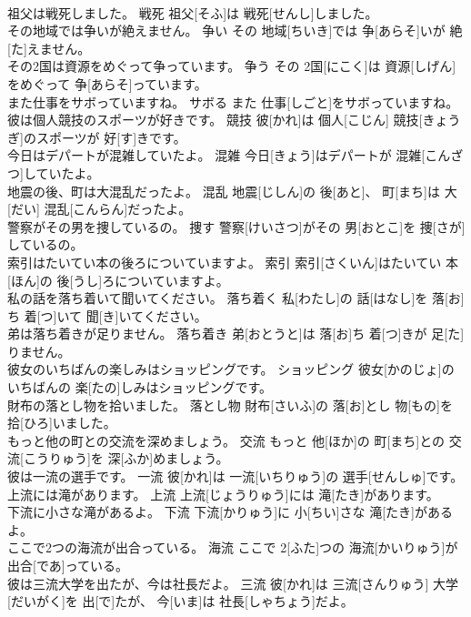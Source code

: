 \documentclass[8pt]{extreport}
\begin{document}
\begin{CJK}{UTF8}{min}
\\	祖父は戦死しました。	戦死	祖父[そふ]は 戦死[せんし]しました。	
\\	その地域では争いが絶えません。	争い	その 地域[ちいき]では 争[あらそ]いが 絶[た]えません。	
\\	その2国は資源をめぐって争っています。	争う	その 2国[にこく]は 資源[しげん]をめぐって 争[あらそ]っています。	
\\	また仕事をサボっていますね。	サボる	また 仕事[しごと]をサボっていますね。	
\\	彼は個人競技のスポーツが好きです。	競技	彼[かれ]は 個人[こじん] 競技[きょうぎ]のスポーツが 好[す]きです。	
\\	今日はデパートが混雑していたよ。	混雑	今日[きょう]はデパートが 混雑[こんざつ]していたよ。	
\\	地震の後、町は大混乱だったよ。	混乱	地震[じしん]の 後[あと]、 町[まち]は 大[だい] 混乱[こんらん]だったよ。	
\\	警察がその男を捜しているの。	捜す	警察[けいさつ]がその 男[おとこ]を 捜[さが]しているの。	
\\	索引はたいてい本の後ろについていますよ。	索引	索引[さくいん]はたいてい 本[ほん]の 後[うし]ろについていますよ。	
\\	私の話を落ち着いて聞いてください。	落ち着く	私[わたし]の 話[はなし]を 落[お]ち 着[つ]いて 聞[き]いてください。	
\\	弟は落ち着きが足りません。	落ち着き	弟[おとうと]は 落[お]ち 着[つ]きが 足[た]りません。	
\\	彼女のいちばんの楽しみはショッピングです。	ショッピング	彼女[かのじょ]のいちばんの 楽[たの]しみはショッピングです。	
\\	財布の落とし物を拾いました。	落とし物	財布[さいふ]の 落[お]とし 物[もの]を 拾[ひろ]いました。	
\\	もっと他の町との交流を深めましょう。	交流	もっと 他[ほか]の 町[まち]との 交流[こうりゅう]を 深[ふか]めましょう。	
\\	彼は一流の選手です。	一流	彼[かれ]は 一流[いちりゅう]の 選手[せんしゅ]です。	
\\	上流には滝があります。	上流	上流[じょうりゅう]には 滝[たき]があります。	
\\	下流に小さな滝があるよ。	下流	下流[かりゅう]に 小[ちい]さな 滝[たき]があるよ。	
\\	ここで2つの海流が出合っている。	海流	ここで 2[ふた]つの 海流[かいりゅう]が 出合[であ]っている。	
\\	彼は三流大学を出たが、今は社長だよ。	三流	彼[かれ]は 三流[さんりゅう] 大学[だいがく]を 出[で]たが、 今[いま]は 社長[しゃちょう]だよ。	

\end{CJK}
\end{document}
